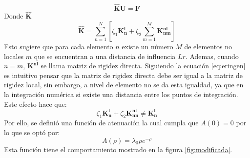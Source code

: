\begin{equation}
	\boldsymbol{\hat{K}U}=\boldsymbol{F}
\end{equation}
Donde $\boldsymbol{\hat{K}}$
\begin{equation}
	\boldsymbol{\hat{K}}=\sum_{n=1}^{N}{\left[\zeta_1\boldsymbol{K_n^{l}}+\zeta_2\sum_{m=1}^{M}\boldsymbol{K_{nm}^{nl}}\right]}
\end{equation}
Esto sugiere que para cada elemento $n$ existe un número $M$ de elementos no locales $m$ que se encuentran a una distancia de influencia $Lr$. Ademas, cuando $n=m$, $\boldsymbol{K^{nl}}$ se llama matriz de rigidez directa. Siguiendo la ecuación \ref{eq:eringen} es intuitivo pensar que la matriz de rigidez directa debe ser igual a la matriz de rigidez local, sin embargo, a nivel de elemento no se da esta igualdad, ya que en la integración numérica si existe una distancia entre los puntos de integración. Este efecto hace que:
\begin{equation}
	\zeta_1\boldsymbol{K_{n}^{l}}+\zeta_2\boldsymbol{K_{nn}^{nl}}\neq\boldsymbol{K_{n}^{l}}
\end{equation}
Por ello, se definió una función de atenuación la cual cumpla que $A(0)=0$ por lo que se optó por:
\begin{equation}
	A(\rho)=\lambda_0\rho e^{-\rho}
\end{equation}
Esta función tiene el comportamiento mostrado en la figura \ref{fig:modificada}.

